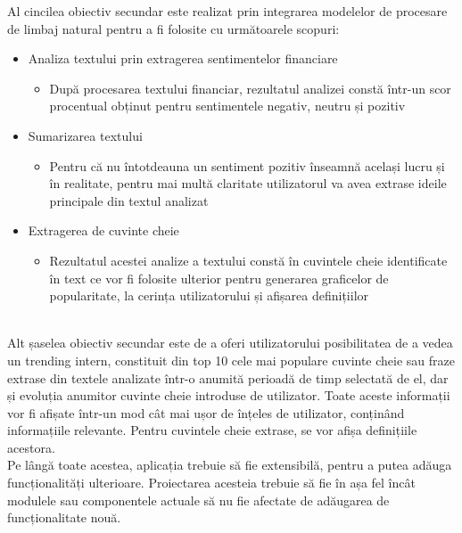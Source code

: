 Al cincilea obiectiv secundar este realizat prin integrarea modelelor de procesare de limbaj natural pentru a fi folosite cu următoarele scopuri:
\begin{itemize}
    \setlength\itemsep{0.5em}
    \item Analiza textului prin extragerea sentimentelor financiare
    \begin{itemize}
        \setlength\itemsep{0.5em}
        \item După procesarea textului financiar, rezultatul analizei constă într-un scor procentual obținut pentru sentimentele negativ, neutru și pozitiv
    \end{itemize}
    \item Sumarizarea textului
    \begin{itemize}
        \setlength\itemsep{0.5em}
        \item Pentru că nu întotdeauna un sentiment pozitiv înseamnă același lucru și în realitate, pentru mai multă claritate utilizatorul va avea extrase ideile principale din textul analizat
    \end{itemize}    
    \item Extragerea de cuvinte cheie
    \begin{itemize}
        \setlength\itemsep{0.5em}
        \item Rezultatul acestei analize a textului constă în cuvintele cheie identificate în text ce vor fi folosite ulterior pentru generarea graficelor de popularitate, la cerința utilizatorului și afișarea definițiilor
    \end{itemize} 
\end{itemize}
\ \\

Alt șaselea obiectiv secundar este de a oferi utilizatorului posibilitatea de a vedea un trending intern, constituit din top 10 cele mai populare cuvinte cheie sau fraze extrase din textele analizate într-o anumită perioadă de timp
selectată de el, dar și evoluția anumitor cuvinte cheie introduse de utilizator. Toate aceste informații vor fi afișate într-un mod cât mai ușor de înțeles de utilizator, conținând informațiile relevante.
Pentru cuvintele cheie extrase, se vor afișa definițiile acestora.\\

Pe lângă toate acestea, aplicația trebuie să fie extensibilă, pentru a putea adăuga funcționalități ulterioare. Proiectarea acesteia trebuie să fie în așa fel încât modulele sau componentele actuale să nu fie afectate de adăugarea de funcționalitate nouă.